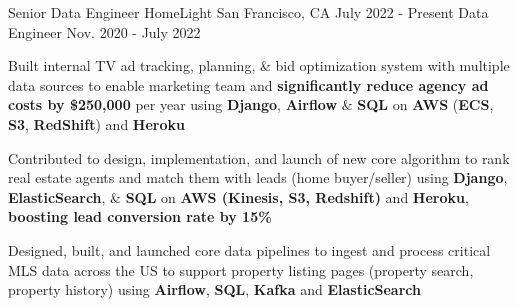 

\begin{cventries}

\cventryupdate
    {Senior Data Engineer} %
    {HomeLight} %
    {San Francisco, CA} %
    {July 2022 - Present} %
    {Data Engineer} %
    {Nov. 2020 - July 2022} %
    {
      \begin{cvitems} %
        \item{Built internal TV ad tracking, planning, \& bid optimization system with multiple data sources to enable marketing team and \textbf{significantly reduce agency ad costs by \$250,000} per year using \textbf{Django}, \textbf{Airflow} \& \textbf{SQL} on \textbf{AWS} (\textbf{ECS}, \textbf{S3}, \textbf{RedShift}) and \textbf{Heroku}}
        \item{Contributed to design, implementation, and launch of new core algorithm to rank real estate agents and match them with leads (home buyer/seller) using \textbf{Django}, \textbf{ElasticSearch},  \& \textbf{SQL} on \textbf{AWS (Kinesis, S3, Redshift)} and \textbf{Heroku}, \textbf{boosting lead conversion rate by 15\%}}
        \item{Designed, built, and launched core data pipelines to ingest and process critical MLS data across the US to support property listing pages (property search, property history) using \textbf{Airflow}, \textbf{SQL}, \textbf{Kafka} and \textbf{ElasticSearch}}

\end{cvitems}}
\end{cventries}
